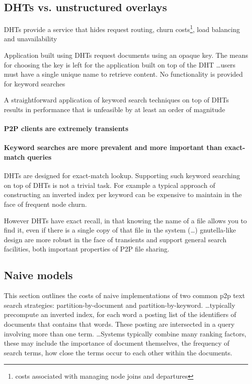 \subsection{DHTs vs. unstructured overlays}

DHTs provide a service that hides request routing, churn costs\footnote{costs associated with managing node joins and departures}, load balancing and unavailability

Application built using DHTs request documents using an opaque key. The means for choosing the key is left for the application built on top of the DHT \ldots users must have a single unique name to retrieve content. No functionality is provided for keyword searches

A straightforward application of keyword search techniques on top of DHTs results in performance that is unfeasible by at least an order of magnitude \cite{LLH+03}

\paragraph{P2P clients are extremely transients}

\paragraph{Keyword searches are more prevalent and more important than exact-match queries} DHTs are designed for exact-match lookup. Supporting such keyword searching on top of DHTs is not a trivial task. For example a typical approach of constructing an inverted index per keyword can be expensive to maintain in the face of frequent node churn.

However DHTs have exact recall, in that knowing the name of a file allows you to find it, even if there is a single copy of that file in the system (\ldots) gnutella-like design are more robust in the face of transients and support general search facilities, both important properties of P2P file sharing.

\subsection{Naive models}
This section outlines the costs of naive implementations of two common p2p text search strategies: partition-by-document and partition-by-keyword. \ldots typically precompute an inverted index, for each word a posting list of the identifiers of documents that contains that words. These posting are intersected in a query involving more than one term. \ldots Systems typically combine many ranking factors, these may include the importance of document themselves, the frequency of search terms, how close the terms occur to each other within the documents.

